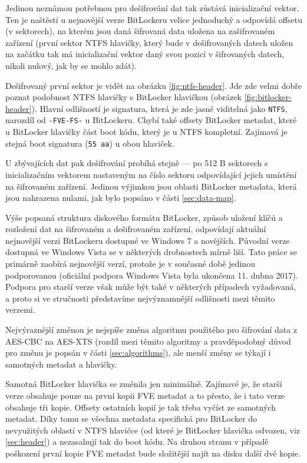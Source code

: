 Jedinou neznámou potřebnou pro dešifrování dat tak zůstává inicializační vektor. Ten je naštěstí u nejnovější verze BitLockeru velice jednoduchý a odpovídá offsetu (v sektorech), na kterém jsou daná šifrovaná data uložena na zašifrovaném zařízení (první sektor NTFS hlavičky, který bude v dešifrovaných datech uložen na začátku tak má inicializační vektor daný svou pozicí v šifrovaných datech, nikoli nulový, jak by se mohlo zdát).

Dešifrovaný první sektor je vidět na obrázku \ref{fig:ntfs-header}. Jde zde velmi dobře poznat podobnost NTFS hlavičky s BitLocker hlavičkou (obrázek \ref{fig:bitlocker-header}). Hlavní odlišností je signatura, která je zde jasně viditelná jako \texttt{NTFS}, narozdíl od \texttt{-FVE-FS-} u BitLockeru. Chybí také offsety BitLocker metadat, které u BitLocker hlavičky  část boot kódu, který je u NTFS kompletní. Zajímavá je stejná boot signatura (\texttt{55 aa}) u obou hlaviček.

U zbývajících dat pak dešifrování probíhá stejně --- po 512 B sektorech s inicializačním vektorem nastaveným na číslo sektoru odpovídající jejich umístění na šifrovaném zařízení. Jedinou výjimkou jsou oblasti BitLocker metadata, která jsou nahrazena nulami, jak bylo popsáno v části \ref{sec:data-map}.

\label{sec:old-versions}

Výše popsaná struktura diskového formátu BitLocker, způsob uložení klíčů a rozložení dat na šifrovaném a dešifrovaném zařízení, odpovídají aktuální nejnovější verzi BitLockeru dostupné ve Windows 7 a novějších. Původní verze dostupná ve Windows Vista se v některých drobnostech mírně liší. Tato práce se primárně zaobírá nejnovější verzí, protože je v současné době jedinou podporovanou (oficiální podpora Windows Vista byla ukončena 11. dubna 2017\cite{hfTs55csrXKY7b4F}). Podpora pro starší verze však může být také v některých případech vyžadovaná, a proto si ve stručnosti představíme nejvýznamnější odlišnosti mezi těmito verzemi.

Nejvýraznější změnou je nejspíše změna algoritmu použitého pro šifrování data z AES-CBC na AES-XTS (rozdíl mezi těmito algoritmy a pravděpodobný důvod pro změnu je popsán v části \ref{sec:algorithms}), ale menší změny se týkají i samotných metadat a hlavičky.


Samotná BitLocker hlavička se změnila jen minimálně. Zajímavé je, že starší verze obsahuje  pouze na první kopii FVE metadat a to přesto, že i tato verze obsahuje tři kopie. Offsety ostatních kopií je tak třeba vyčíst ze samotných metadat. Díky tomu se všechna metadata specifická pro BitLocker  do nevyužitých oblastí v NTFS hlavičce (od které je BitLocker hlavička odvozen, viz \ref{sec:header}) a nezasahují tak do boot kódu. Na druhou stranu v případě poškození první kopie FVE metadat bude složitější najít na disku další dvě  kopie.

